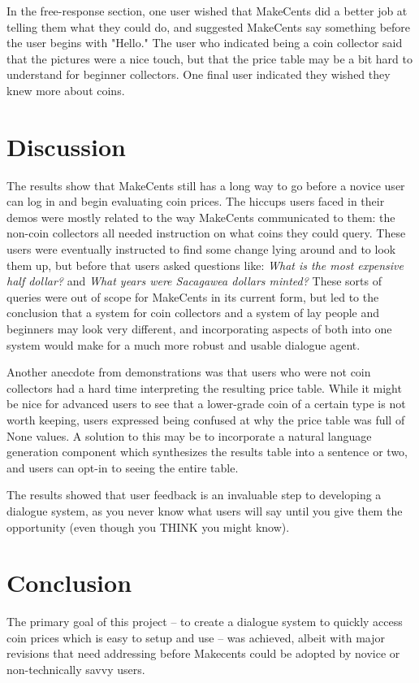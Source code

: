 \documentclass[11pt,a4paper]{article}
\begin{document}
In the free-response section, one user wished that MakeCents did a better job at telling them what they could do, and suggested MakeCents say something before the user begins with "Hello." The user who indicated being a coin collector said that the pictures were a nice touch, but that the price table may be a bit hard to understand for beginner collectors. One final user indicated they wished they knew more about coins.

\section{Discussion}
The results show that MakeCents still has a long way to go before a novice user can log in and begin evaluating coin prices. The hiccups users faced in their demos were mostly related to the way MakeCents communicated to them: the non-coin collectors all needed instruction on what coins they could query. These users were eventually instructed to find some change lying around and to look them up, but before that users asked questions like: \textit{What is the most expensive half dollar?} and \textit{What years were Sacagawea dollars minted?} These sorts of queries were out of scope for MakeCents in its current form, but led to the conclusion that a system for coin collectors and a system of lay people and beginners may look very different, and incorporating aspects of both into one system would make for a much more robust and usable dialogue agent.

Another anecdote from demonstrations was that users who were not coin collectors had a hard time interpreting the resulting price table. While it might be nice for advanced users to see that a lower-grade coin of a certain type is not worth keeping, users expressed being confused at why the price table was full of None values. A solution to this may be to incorporate a natural language generation component which synthesizes the results table into a sentence or two, and users can opt-in to seeing the entire table.

The results showed that user feedback is an invaluable step to developing a dialogue system, as you never know what users will say until you give them the opportunity (even though you THINK you might know). 

\section{Conclusion}
The primary goal of this project -- to create a dialogue system to quickly access coin prices which is easy to setup and use -- was achieved, albeit with major revisions that need addressing before Makecents could be adopted by novice or non-technically savvy users. 
\end{document}
